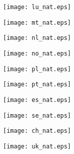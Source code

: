 \documentclass[a4paper, 12pt]{article}
\begin{document}
\clearpage


\begin{figure}[ht]
	\centering
		\texttt{[image: lu\_nat.eps]}
\end{figure}


\clearpage


\begin{figure}[ht]
	\centering
		\texttt{[image: mt\_nat.eps]}
\end{figure}


\clearpage


\begin{figure}[ht]
	\centering
		\texttt{[image: nl\_nat.eps]}
\end{figure}


\clearpage


\begin{figure}[ht]
	\centering
		\texttt{[image: no\_nat.eps]}
\end{figure}


\clearpage


\begin{figure}[ht]
	\centering
		\texttt{[image: pl\_nat.eps]}
\end{figure}


\clearpage


\begin{figure}[ht]
	\centering
		\texttt{[image: pt\_nat.eps]}
\end{figure}



\clearpage


\begin{figure}[ht]
	\centering
		\texttt{[image: es\_nat.eps]}
\end{figure}


\clearpage

\begin{figure}[ht]
	\centering
		\texttt{[image: se\_nat.eps]}
\end{figure}


\clearpage

\begin{figure}[ht]
	\centering
		\texttt{[image: ch\_nat.eps]}
\end{figure}


\clearpage

\begin{figure}[ht]
	\centering
		\texttt{[image: uk\_nat.eps]}
\end{figure}
\end{document}

